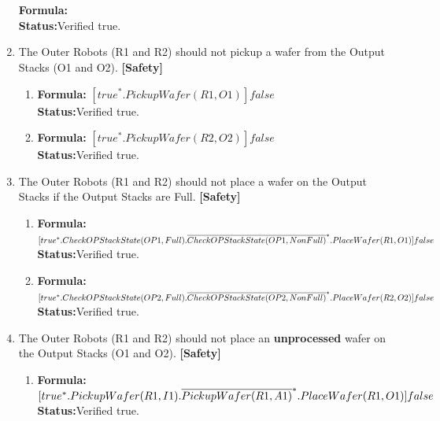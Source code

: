 \documentclass[a4paper,12pt]{article}
\begin{document}
\begin{enumerate}
\\
\\\textbf{Formula:} 
\\\textbf{Status:}Verified true.
%
\item The Outer Robots (R1 and R2) should not pickup a wafer from the Output Stacks (O1 and O2). \textbf{[Safety]}
\begin{enumerate}
\item \textbf{Formula:} $[true^* . PickupWafer(R1, O1)] false$
\\\textbf{Status:}Verified true.
\item \textbf{Formula:} $[true^* . PickupWafer(R2, O2)] false$
\\\textbf{Status:}Verified true.
\end{enumerate}
\item The Outer Robots (R1 and R2) should not place a wafer on the Output Stacks if the Output Stacks are Full. \textbf{[Safety]}
\begin{enumerate}

\item \textbf{Formula:} $[true^* . CheckOPStackState(OP1,Full). \\\overline{CheckOPStackState(OP1, NonFull)}^* .PlaceWafer(R1, O1)] false $
\\\textbf{Status:}Verified true.

\item \textbf{Formula:} $[true^* . CheckOPStackState(OP2,Full). \\\overline{CheckOPStackState(OP2, NonFull)}^* .PlaceWafer(R2, O2)] false $
\\\textbf{Status:}Verified true.
\end{enumerate}
\item The Outer Robots (R1 and R2) should not place an \textbf{unprocessed} wafer on the Output Stacks (O1 and O2). \textbf{[Safety]}
\begin{enumerate}

\item \textbf{Formula:} $[true^* . PickupWafer(R1, I1) .\overline{PickupWafer(R1, A1)}^* . 
\\PlaceWafer(R1, O1)] false $
\\\textbf{Status:}Verified true.


\end{enumerate}
\end{enumerate}
\end{document}
